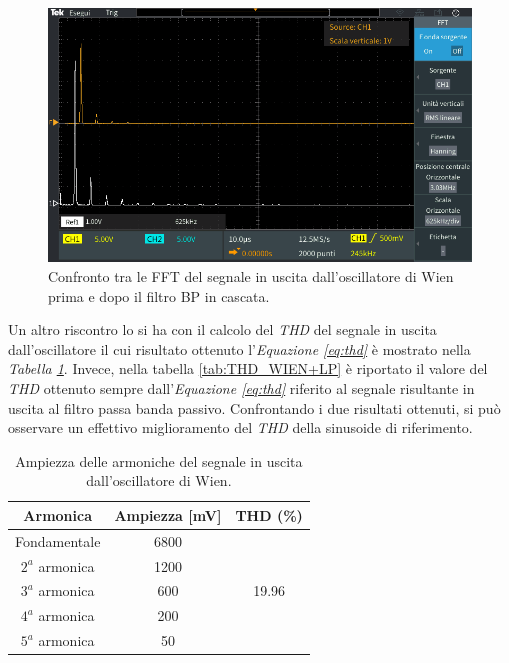 \documentclass[titlepage]{report}
\begin{document}
	\begin{figure}[H]
		\centering
		\includegraphics[scale=0.5]{Immagini/fft_osc+bp210k.PNG}
		\caption{Confronto tra le FFT del segnale in uscita dall'oscillatore di Wien prima e dopo il filtro BP in cascata.}
		\label{fig:FFTwien+BP}
	\end{figure}

	Un altro riscontro lo si ha con il calcolo del \textit{THD} del segnale in uscita dall'oscillatore il cui risultato ottenuto l'\textit{Equazione \ref{eq:thd}} è mostrato nella \textit{Tabella \ref{tab:THD_WIEN}}. Invece, nella tabella \ref{tab:THD_WIEN+LP} è riportato il valore del \textit{THD} ottenuto sempre dall'\textit{Equazione \ref{eq:thd}} riferito al segnale risultante in uscita al filtro passa banda passivo. 
	Confrontando i due risultati ottenuti, si può osservare un effettivo miglioramento del \textit{THD} della sinusoide di riferimento.

	\begin{table}[h!]
		\centering
		\begin{tabular}{||c|c|c||}
			\hline
			\cellcolor{gray!10}Armonica & \cellcolor{gray!10}Ampiezza [mV] & \cellcolor{gray!10}THD (\%) \\
			\hline
			Fondamentale & 6800 &\\
			\cline{1-2}
			$2^a$ armonica & 1200 & \\
			\cline{1-2} 
			$3^a$ armonica & 600 & 19.96 \\
			\cline{1-2} 
			$4^a$ armonica & 200 & \\
			\cline{1-2} 
			$5^a$ armonica & 50 & \\
			\hline	
		\end{tabular}
		\caption{Ampiezza delle armoniche del segnale in uscita dall'oscillatore di Wien.}
		\label{tab:THD_WIEN}
	\end{table}
\end{document}
